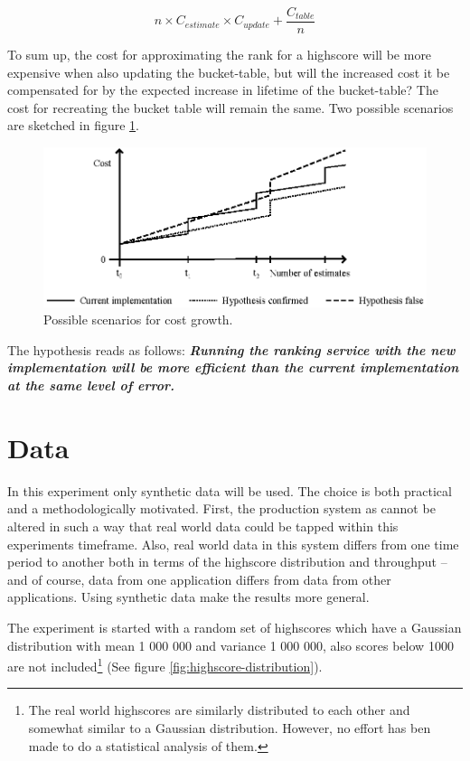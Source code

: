 
\begin{equation}
  n \times C_{estimate} \times C_{update} + \frac{ C_{table}}{n}
\end{equation}

To sum up, the cost for approximating the rank for a highscore will be more expensive when also updating the bucket-table, but will the increased cost it be compensated for by the expected increase in lifetime of the bucket-table? The cost for recreating the bucket table will remain the same. Two possible scenarios are sketched in figure \ref{fig:cost}.

\begin{figure}[h]
  \centering
  \caption{Possible scenarios for cost growth.}
  \label{fig:cost}
  \includegraphics[width=13cm]{img/hypothesis-cost1.eps}
\end{figure} 

The hypothesis reads as follows: \emph{\textbf{Running the ranking service with the new implementation will be more efficient than the current implementation at the same level of error.}}

\section{Data}

In this experiment only synthetic data will be used. The choice is both practical and a methodologically motivated. First, the production system as cannot be altered in such a way that real world data could be tapped within this experiments timeframe. Also, real world data in this system differs from one time period to another both in terms of the highscore distribution and throughput -- and of course, data from one application differs from data from other applications. Using synthetic data make the results more general.

The experiment is started with a random set of highscores which have a Gaussian distribution with mean 1 000 000 and variance 1 000 000, also scores below 1000 are not included\footnote{The real world highscores are similarly distributed to each other and somewhat similar to a Gaussian distribution. However, no effort has ben made to do a statistical analysis of them.} (See figure \ref{fig:highscore-distribution}).
 
